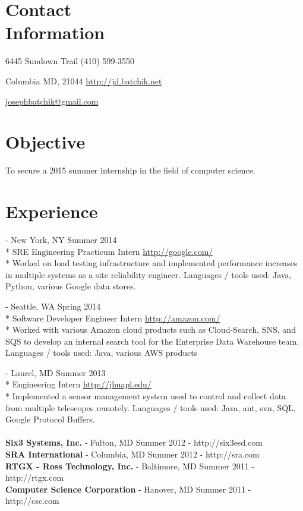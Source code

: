 \documentclass[a4paper,margin,line]{resume}
\newcommand{\rurl}[1]{\hfill {\footnotesize \url{#1}}}
\newcommand{\rdate}[1]{\hfill {\small #1}}
\renewcommand{\employer}[5]{\item[#1] - #2 \rdate{#3} \\* #4 \rurl{#5} \\*}
\begin{document}
\begin{resume}
\section{\mysidestyle Contact \\ Information} \vspace{2mm}
	\begin{asparablank}
    \item 6445 Sundown Trail  \hfill (410) 599-3550
		\item Columbia MD, 21044 \hfill \href{http://jd.batchik.net/}{http://jd.batchik.net}
		\item  \hfill \href{mailto:josephbatchik@gmail.com}{josephbatchik@gmail.com}
	\end{asparablank}

\section{\mysidestyle Objective}
	To secure a 2015 summer internship in the field of computer science.

\section{\mysidestyle Experience}
	\begin{asparadesc}
        \employer{Google}{New York, NY}{Summer 2014}{SRE Engineering Practicum Intern}
        {http://google.com/}
		\small
        Worked on load testing infrastructure and implemented performance increases 
        in multiple systems as a site reliability engineer. Languages / tools used: 
        Java, Python, various Google data stores.
		\normalsize
		\\
		\employer{Amazon}{Seattle, WA}{Spring 2014}{Software Developer Engineer Intern}
        {http://amazon.com/}
		\small
	    Worked with various Amazon cloud products such as Cloud-Search, SNS, and SQS 
        to develop an internal search tool for the Enterprise Data Warehouse team. 
        Languages / tools used: Java, various AWS products
        \normalsize
		\\
		\employer{John Hopkins University Applied Physics Lab}{Laurel, MD}
        {Summer 2013}{Engineering Intern}{http://jhuapl.edu/}
		\small
		Implemented a sensor management system used to control and collect data from 
        multiple telescopes remotely. Languages / tools used: Java, ant, svn, SQL, 
        Google Protocol Buffers.
        \normalsize
        \\
        \\
        \textbf{Six3 Systems, Inc.} - Fulton, MD \hfill Summer 2012 - http://six3esd.com \\
        \textbf{SRA International} - Columbia, MD \hfill Summer 2012 - http://sra.com \\
        \textbf{RTGX - Ross Technology, Inc.} - Baltimore, MD \hfill Summer 2011 - http://rtgx.com \\
        \textbf{Computer Science Corporation} - Hanover, MD \hfill Summer 2011 - http://csc.com
    \end{asparadesc}


\end{resume}
\end{document}
